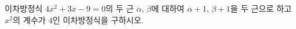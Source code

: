 이차방정식 $4x^2+3x-9=0$의 두 근 $\alpha$, $\beta$에 대하여 $\alpha+1$, $\beta+1$을 두 근으로 하고 $x^2$의 계수가 $4$인 이차방정식을 구하시오.

